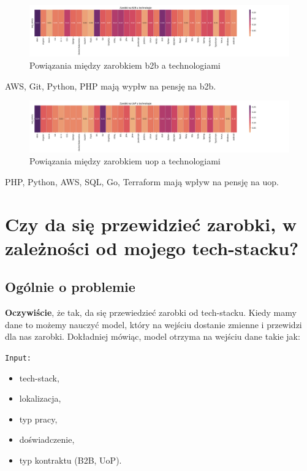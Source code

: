 \documentclass[a4paper]{article}
\begin{document}
\begin{figure}[H]
    \centering
    \includegraphics[width=\textwidth]{../analysis/plots/korelacje/zarobki_na_b2b_a_technologie.png}
    \caption{Powiązania między zarobkiem b2b a technologiami}
\end{figure}

\quad AWS, Git, Python, PHP mają wypłw na pensję na b2b.

\begin{figure}[H]
    \centering
    \includegraphics[width=\textwidth]{../analysis/plots/korelacje/zarobki_na_uop_a_technologie.png}
    \caption{Powiązania między zarobkiem uop a technologiami}
\end{figure}

\quad PHP, Python, AWS, SQL, Go, Terraform mają wpływ na pensję na uop.


\section{Czy da się przewidzieć zarobki, w zależności od mojego tech-stacku?}

\subsection{Ogólnie o problemie}

\quad \textbf{Oczywiście}, że tak, da się przewiedzieć zarobki od tech-stacku. Kiedy mamy dane to możemy nauczyć model, który na wejściu dostanie zmienne i przewidzi dla nas
zarobki. Dokładniej mówiąc, model otrzyma na wejściu dane takie jak:

\texttt{Input:}

\begin{itemize}
    \item tech-stack,
    \item lokalizacja,
    \item typ pracy,
    \item doświadczenie,
    \item typ kontraktu (B2B, UoP).
\end{itemize}
\end{document}
